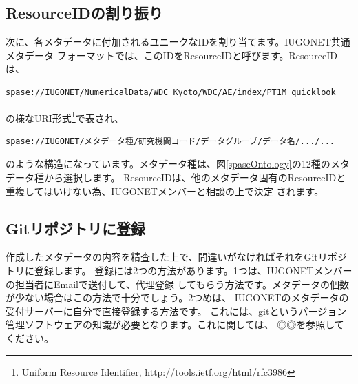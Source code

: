 \subsection{ResourceIDの割り振り}
 次に、各メタデータに付加されるユニークなIDを割り当てます。IUGONET共通メタデータ
フォーマットでは、このIDをResourceIDと呼びます。ResourceIDは、
\begin{screen}
\begin{verbatim}
spase://IUGONET/NumericalData/WDC_Kyoto/WDC/AE/index/PT1M_quicklook
\end{verbatim}
\end{screen}
の様なURI形式\footnote{Uniform Resource Identifier, http://tools.ietf.org/html/rfc3986}で表され、
\begin{screen}
\begin{verbatim}
spase://IUGONET/メタデータ種/研究機関コード/データグループ/データ名/.../...
\end{verbatim}
\end{screen}
のような構造になっています。メタデータ種は、図\ref{spaseOntology}の12種のメタデータ種から選択します。
ResourceIDは、他のメタデータ固有のResourceIDと重複してはいけない為、IUGONETメンバーと相談の上で決定
されます。

\subsection{Gitリポジトリに登録}

作成したメタデータの内容を精査した上で、間違いがなければそれをGitリポジトリに登録します。
登録には2つの方法があります。1つは、IUGONETメンバーの担当者にEmailで送付して、代理登録
してもらう方法です。メタデータの個数が少ない場合はこの方法で十分でしょう。2つめは、
IUGONETのメタデータの受付サーバーに自分で直接登録する方法です。
これには、gitというバージョン管理ソフトウェアの知識が必要となります。これに関しては、
◎◎を参照してください。









